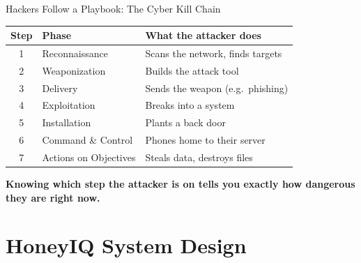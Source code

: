 \documentclass[aspectratio=169, 12pt]{beamer}
\begin{document}
\begin{frame}{Hackers Follow a Playbook: The Cyber Kill Chain}
  \begin{table}
    \centering
    \begin{tabular}{clp{5.5cm}}
      \toprule
      \textbf{Step} & \textbf{Phase} & \textbf{What the attacker does} \\
      \midrule
      1 & Reconnaissance       & Scans the network, finds targets \\
      2 & Weaponization        & Builds the attack tool \\
      3 & Delivery             & Sends the weapon (e.g.\ phishing) \\
      4 & Exploitation         & Breaks into a system \\
      5 & Installation         & Plants a back door \\
      6 & Command \& Control   & Phones home to their server \\
      7 & Actions on Objectives & Steals data, destroys files \\
      \bottomrule
    \end{tabular}
  \end{table}
  \vspace{0.3cm}
  \begin{center}
    \textcolor{honeyorange}{\textbf{Knowing which step the attacker is on tells you exactly how dangerous they are right now.}}
  \end{center}
\end{frame}

\section{HoneyIQ System Design}
\end{document}
